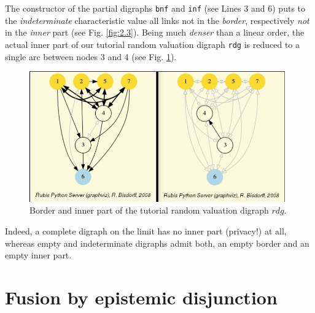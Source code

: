 The constructor of the partial digraphs \texttt{bnf} and \texttt{inf}  (see Lines 3 and 6) puts to the \emph{indeterminate} characteristic value all links not in the \emph{border}, respectively \emph{not} in the \emph{inner} part (see Fig. \ref{fig:2.3}). Being much {\em denser\/} than a linear order, the actual inner part of our tutorial random valuation digraph \texttt{rdg} is reduced to a single arc between nodes 3 and 4 (see Fig. \ref{fig:2.4}).
\begin{figure}[h]
\includegraphics[width=11cm]{Figures/graphBorderAndInner.png}
\caption{Border and inner part of the tutorial random valuation digraph $rdg$.}
\label{fig:2.4}       %
\end{figure}
Indeed, a complete digraph on the limit has no inner part (privacy!) at all, whereas empty and indeterminate digraphs admit both, an empty border and an empty inner part.

\section{Fusion by epistemic disjunction}
\label{sec:2.5}

